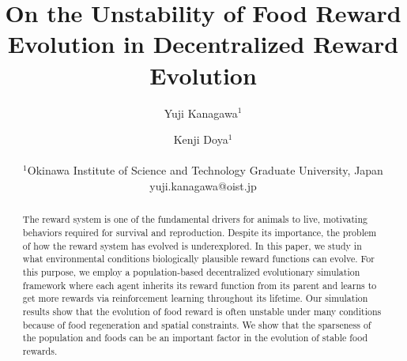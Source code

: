 \documentclass[letterpaper]{article}
\title{On the Unstability of Food Reward Evolution in Decentralized Reward Evolution}
\author{
  Yuji Kanagawa$^{1}$ \and
  Kenji Doya$^{1}$ \\
  \mbox{}\\
  $^1$Okinawa Institute of Science and Technology Graduate University, Japan
  yuji.kanagawa@oist.jp
} %
\newcommand{\1}{\mathbb{I} } %
\newcounter{num}
\begin{document}
\maketitle

\begin{abstract}
  The reward system is one of the fundamental drivers for animals to live, motivating behaviors required for survival and reproduction. Despite its importance, the problem of how the reward system has evolved is underexplored. In this paper, we study in what environmental conditions biologically plausible reward functions can evolve. For this purpose, we employ a population-based decentralized evolutionary simulation framework where each agent inherits its reward function from its parent and learns to get more rewards via reinforcement learning throughout its lifetime. Our simulation results show that the evolution of food reward is often unstable under many conditions because of food regeneration and spatial constraints. We show that the sparseness of the population and foods can be an important factor in the evolution of stable food rewards.
\end{abstract}








% 
\end{document}
